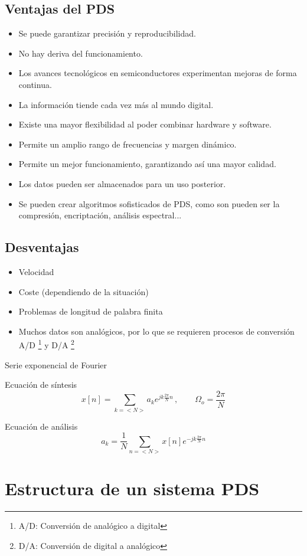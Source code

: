 \documentclass[a4paper]{book}
\begin{document}
\subsection{Ventajas del PDS}
\begin{itemize}
	\item Se puede garantizar precisión y reproducibilidad.
	\item No hay deriva del funcionamiento.
	\item Los avances tecnológicos en semiconductores experimentan mejoras de forma continua.
	\item La información tiende cada vez más al mundo digital.
	\item Existe una mayor flexibilidad al poder combinar hardware y software.
	\item Permite un amplio rango de frecuencias y margen dinámico.
	\item Permite un mejor funcionamiento, garantizando así una mayor calidad.
	\item Los datos pueden ser almacenados para un uso posterior.
	\item Se pueden crear algoritmos sofisticados de PDS, como son pueden ser la compresión, encriptación, análisis espectral...
\end{itemize}

\subsection{Desventajas}
\begin{itemize}
	\item Velocidad
	\item Coste (dependiendo de la situación)
	\item Problemas de longitud de palabra finita
	\item Muchos datos son analógicos, por lo que se requieren procesos de conversión A/D \footnote{A/D: Conversión de analógico a digital} y D/A \footnote{D/A: Conversión de digital a analógico}
\end{itemize}

Serie exponencial de Fourier

Ecuación de síntesis
\[ \boxed{x[n] = \sum_{k=<N>}^{}a_ke^{jk \frac{2\pi}{N} n}} \, , \qquad \Omega_o = \frac{2\pi}{N} \]

Ecuación de análisis
\[ a_k = \frac{1}{N} \sum_{n = <N>}^{}x[n]e^{-jk \frac{2 \pi}{N}n}  \]

\section{Estructura de un sistema PDS}
\end{document}
